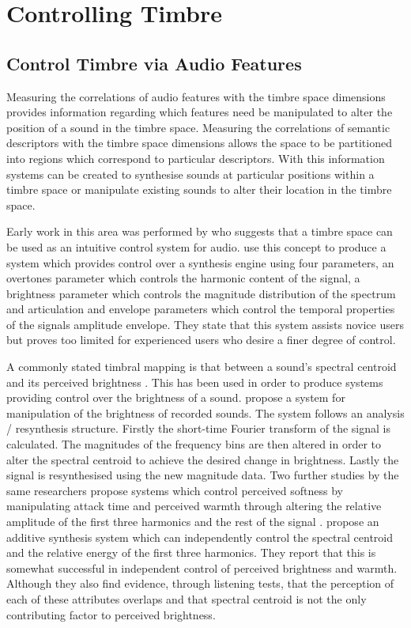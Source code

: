 \section{Controlling Timbre}
\label{sec:Timbre-Control}
	\subsection{Control Timbre via Audio Features}
	\label{sec:Timbre-Control-TimbreSpaces}
		Measuring the correlations of audio features with the timbre space dimensions provides information
		regarding which features need be manipulated to alter the position of a sound in the timbre space.
		Measuring the correlations of semantic descriptors with the timbre space dimensions allows the space to be
		partitioned into regions which correspond to particular descriptors. With this information systems can be
		created to synthesise sounds at particular positions within a timbre space or manipulate existing sounds to
		alter their location in the timbre space.

		Early work in this area was performed by \citet{wessel1979timbre} who suggests that a timbre space can be
		used as an intuitive control system for audio. \citet{vertegaal1994isee} use this concept to produce a
		system which provides control over a synthesis engine using four parameters, an overtones parameter which
		controls the harmonic content of the signal, a brightness parameter which controls the magnitude
		distribution of the spectrum and articulation and envelope parameters which control the temporal properties
		of the signals amplitude envelope. They state that this system assists novice users but proves too limited
		for experienced users who desire a finer degree of control.

		A commonly stated timbral mapping is that between a sound's spectral centroid and its perceived brightness
		\citep{schubert2006does}. This has been used in order to produce systems providing control over the
		brightness of a sound. \citet{williams2007perceptually} propose a system for manipulation of the brightness
		of recorded sounds. The system follows an analysis / resynthesis structure. Firstly the short-time Fourier
		transform of the signal is calculated. The magnitudes of the frequency bins are then altered in order to
		alter the spectral centroid to achieve the desired change in brightness. Lastly the signal is resynthesised
		using the new magnitude data.  Two further studies by the same researchers propose systems which control
		perceived softness by manipulating attack time \citep{williams2009perceptually} and perceived warmth
		through altering the relative amplitude of the first three harmonics and the rest of the signal
		\citep{williams2010perceptually}. \citet{zacharakis2011an} propose an additive synthesis system which can
		independently control the spectral centroid and the relative energy of the first three harmonics. They
		report that this is somewhat successful in independent control of perceived brightness and warmth. Although
		they also find evidence, through listening tests, that the perception of each of these attributes overlaps
		and that spectral centroid is not the only contributing factor to perceived brightness.

